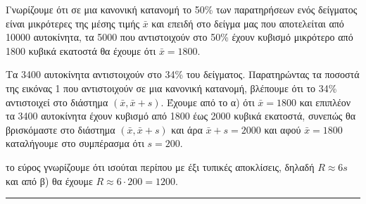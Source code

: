\begin{alist}
    \item Γνωρίζουμε ότι σε μια κανονική κατανομή το 50\% των παρατηρήσεων ενός δείγματος είναι μικρότερες της μέσης τιμής $\bar{x}$ και επειδή στο δείγμα μας που αποτελείται από 10000 αυτοκίνητα, τα 5000 που αντιστοιχούν στο 50\% έχουν κυβισμό μικρότερο από 1800 κυβικά εκατοστά θα έχουμε ότι $\bar{x} = 1800$.
    \item Τα 3400 αυτοκίνητα αντιστοιχούν στο 34\% του δείγματος. Παρατηρώντας τα ποσοστά της εικόνας 1 που αντιστοιχούν σε μια κανονική κατανομή, βλέπουμε ότι το 34\% αντιστοιχεί στο διάστημα $(\bar{x}, \bar{x} + s)$.
    Έχουμε από το α) ότι $\bar{x} = 1800$ και επιπλέον τα 3400 αυτοκίνητα έχουν κυβισμό από 1800 έως 2000 κυβικά εκατοστά, συνεπώς θα βρισκόμαστε στο διάστημα $(\bar{x}, \bar{x} + s)$ και άρα $\bar{x} + s = 2000$ και αφού $\bar{x} = 1800$ καταλήγουμε στο συμπέρασμα ότι $s=200$.
    \item το εύρος γνωρίζουμε ότι ισούται περίπου με έξι τυπικές αποκλίσεις, δηλαδή $R \approx 6s$ και από β) θα έχουμε $R \approx 6 \cdot 200 = 1200$.
\end{alist}
\vspace{6mm}
\noindent\rule{\textwidth}{0.4pt}
\vspace{6mm}

